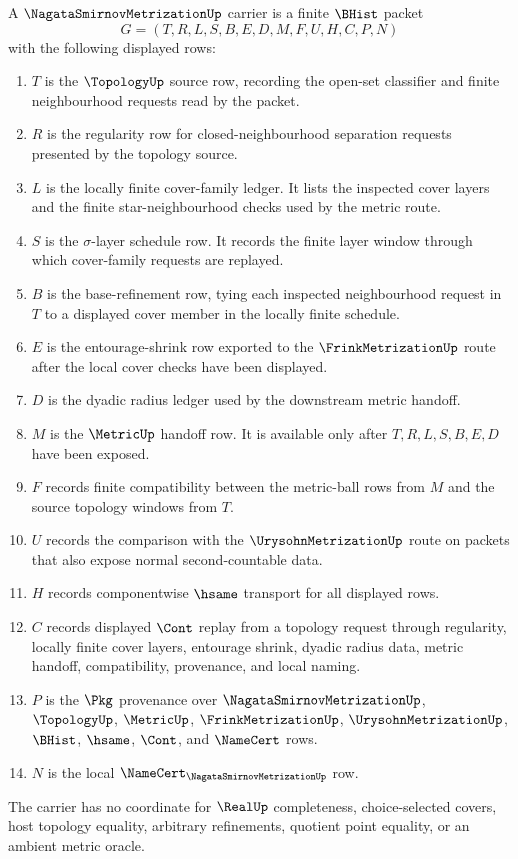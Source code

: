 \begin{definition}
\label{def:nagata-smirnov-metrization-carrier}
A $\NagataSmirnovMetrizationUp$ carrier is a finite $\BHist$ packet
$$
G=(T,R,L,S,B,E,D,M,F,U,H,C,P,N)
$$
with the following displayed rows:
\begin{enumerate}
\item $T$ is the $\TopologyUp$ source row, recording the open-set classifier and finite neighbourhood requests read by the packet.
\item $R$ is the regularity row for closed-neighbourhood separation requests presented by the topology source.
\item $L$ is the locally finite cover-family ledger. It lists the inspected cover layers and the finite star-neighbourhood checks used by the metric route.
\item $S$ is the $\sigma$-layer schedule row. It records the finite layer window through which cover-family requests are replayed.
\item $B$ is the base-refinement row, tying each inspected neighbourhood request in $T$ to a displayed cover member in the locally finite schedule.
\item $E$ is the entourage-shrink row exported to the $\FrinkMetrizationUp$ route after the local cover checks have been displayed.
\item $D$ is the dyadic radius ledger used by the downstream metric handoff.
\item $M$ is the $\MetricUp$ handoff row. It is available only after $T,R,L,S,B,E,D$ have been exposed.
\item $F$ records finite compatibility between the metric-ball rows from $M$ and the source topology windows from $T$.
\item $U$ records the comparison with the $\UrysohnMetrizationUp$ route on packets that also expose normal second-countable data.
\item $H$ records componentwise $\hsame$ transport for all displayed rows.
\item $C$ records displayed $\Cont$ replay from a topology request through regularity, locally finite cover layers, entourage shrink, dyadic radius data, metric handoff, compatibility, provenance, and local naming.
\item $P$ is the $\Pkg$ provenance over $\NagataSmirnovMetrizationUp$, $\TopologyUp$, $\MetricUp$, $\FrinkMetrizationUp$, $\UrysohnMetrizationUp$, $\BHist$, $\hsame$, $\Cont$, and $\NameCert$ rows.
\item $N$ is the local $\NameCert_{\NagataSmirnovMetrizationUp}$ row.
\end{enumerate}
The carrier has no coordinate for $\RealUp$ completeness, choice-selected covers, host topology equality, arbitrary refinements, quotient point equality, or an ambient metric oracle.
\end{definition}

